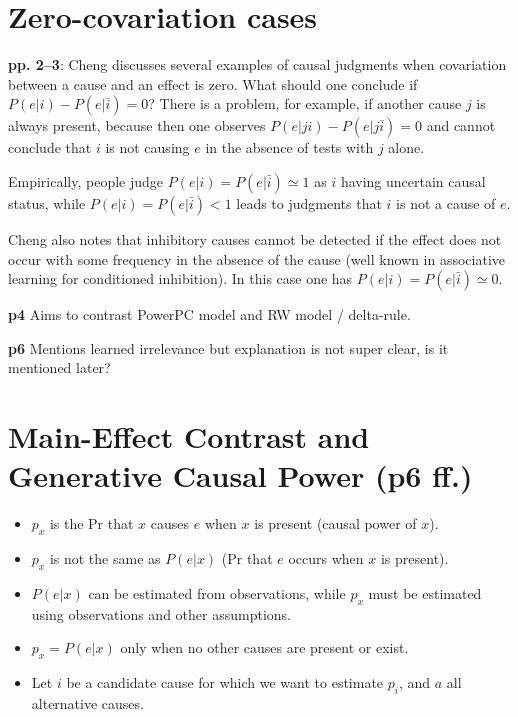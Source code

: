 \documentclass[11pt]{article}
\date{\today}
\title{}
\begin{document}
\tableofcontents

\section{Zero-covariation cases}
\label{sec:orgde51e43}

\textbf{pp. 2--3}: Cheng discusses several examples of causal judgments when
covariation between a cause and an effect is zero. What should one
conclude if \(P(e|i) - P(e|\bar i)=0\)? There is a problem, for example,
if another cause \(j\) is always present, because then one observes
\(P(e|ji) - P(e|j\bar i)=0\) and cannot conclude that \(i\) is not causing
\(e\) in the absence of tests with \(j\) alone.

Empirically, people judge \(P(e|i)=P(e|\bar i)\simeq 1\) as \(i\) having
uncertain causal status, while \(P(e|i)=P(e|\bar i)<1\) leads to
judgments that \(i\) is not a cause of \(e\).

Cheng also notes that inhibitory causes cannot be detected if the
effect does not occur with some frequency in the absence of the cause
(well known in associative learning for conditioned inhibition). In
this case one has \(P(e|i)=P(e|\bar i)\simeq 0\).

\textbf{p4} Aims to contrast PowerPC model and RW model / delta-rule.

\textbf{p6} Mentions learned irrelevance but explanation is not super clear,
 is it mentioned later?

\section{Main-Effect Contrast and Generative Causal Power (p6 ff.)}
\label{sec:org138f5ae}

\begin{itemize}
\item \(p_x\) is the Pr that \(x\) causes \(e\) when \(x\) is present
(causal power of \(x\)).
\item \(p_x\) is not the same as \(P(e|x)\) (Pr that \(e\) occurs when \(x\) is
present).
\item \(P(e|x)\) can be estimated from observations, while \(p_x\) must be
estimated using observations and other assumptions.
\item \(p_x = P(e|x)\) only when no other causes are present or exist.
\item Let \(i\) be a candidate cause for which we want to estimate \(p_i\),
and \(a\) all alternative causes.
\end{itemize}
\end{document}

